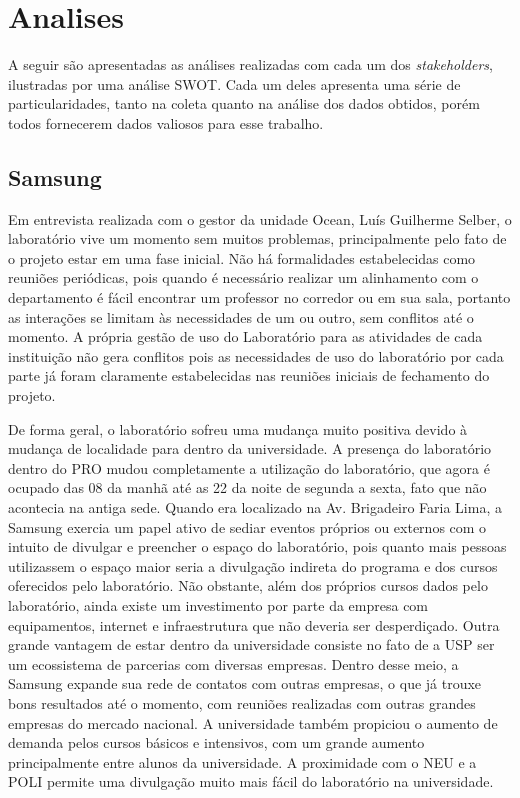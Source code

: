 \chapter{Analises}
\label{cha:analises}

A seguir são apresentadas as análises realizadas com cada um dos \textit{stakeholders}, ilustradas por uma análise SWOT. Cada um deles apresenta uma série de particularidades, tanto na coleta quanto na análise dos dados obtidos, porém todos fornecerem dados valiosos para esse trabalho.

\section{Samsung}

Em entrevista realizada com o gestor da unidade Ocean, Luís Guilherme Selber, o laboratório vive um momento sem muitos problemas, principalmente pelo fato de o projeto estar em uma fase inicial. Não há formalidades estabelecidas como reuniões periódicas, pois quando é necessário realizar um alinhamento com o departamento é fácil encontrar um professor no corredor ou em sua sala, portanto as interações se limitam às necessidades de um ou outro, sem conflitos até o momento. A própria gestão de uso do Laboratório para as atividades de cada instituição não gera conflitos pois as necessidades de uso do laboratório por cada parte já foram claramente estabelecidas nas reuniões iniciais de fechamento do projeto.

De forma geral, o laboratório sofreu uma mudança muito positiva devido à mudança de localidade para dentro da universidade. A presença do laboratório dentro do PRO mudou completamente a utilização do laboratório, que agora é ocupado das 08 da manhã até as 22 da noite de segunda a sexta, fato que não acontecia na antiga sede. Quando era localizado na Av. Brigadeiro Faria Lima, a Samsung exercia um papel ativo de sediar eventos próprios ou externos com o intuito de divulgar e preencher o espaço do laboratório, pois quanto mais pessoas utilizassem o espaço maior seria a divulgação indireta do programa e dos cursos oferecidos pelo laboratório. Não obstante, além dos próprios cursos dados pelo laboratório, ainda existe um investimento por parte da empresa com equipamentos, internet e infraestrutura que não deveria ser desperdiçado. Outra grande vantagem de estar dentro da universidade consiste no fato de a USP ser um ecossistema de parcerias com diversas empresas. Dentro desse meio, a Samsung expande sua rede de contatos com outras empresas, o que já trouxe bons resultados até o momento, com reuniões realizadas com outras grandes empresas do mercado nacional. A universidade também propiciou o aumento de demanda pelos cursos básicos e intensivos, com um grande aumento principalmente entre alunos da universidade. A proximidade com o NEU e a POLI permite uma divulgação muito mais fácil do laboratório na universidade.

